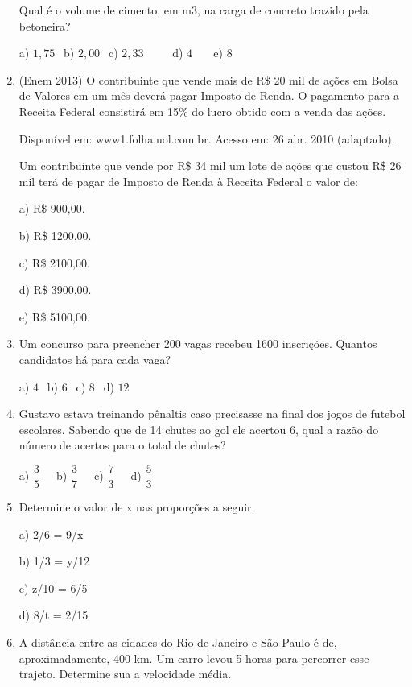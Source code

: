 \begin{multicols*}{2}
\begin{enumerate}
		      Qual é o volume de cimento, em m3, na carga de concreto trazido pela betoneira?

		      a) $1,75 \ \ $ b) $2,00 \ \ $ c) $2,33 \ \ \ \ \ \ \ \ \ \ $ d) $4 \ \ \ \ \ \ \ $ e) $8 \ \ $

		\item (Enem 2013) O contribuinte que vende mais de R\$ 20 mil de ações em Bolsa de Valores em um mês deverá pagar Imposto de Renda. O pagamento para a Receita Federal consistirá em 15\% do lucro obtido com a venda das ações.

		      Disponível em: www1.folha.uol.com.br. Acesso em: 26
		      abr. 2010 (adaptado).

		      Um contribuinte que vende por R\$ 34 mil um lote de ações que custou R\$ 26 mil terá de pagar de Imposto de Renda à
		      Receita Federal o valor de:

		      a) R\$ 900,00.

		      b) R\$ 1200,00.

		      c) R\$ 2100,00.

		      d) R\$ 3900,00.

		      e) R\$ 5100,00.\\

		\item Um concurso para preencher 200 vagas recebeu 1600 inscrições. Quantos candidatos há para cada vaga?

		      a) $4 \ \ $ b) $6 \ \ $ c) $8 \ \ $ d) $12 \ \ $

		\item Gustavo estava treinando pênaltis caso precisasse na final dos jogos de futebol escolares. Sabendo que de 14 chutes ao gol ele acertou 6, qual a razão do número de acertos para o total de chutes?

		      a) $\dfrac{3}{5} \ \ \ \ \ $ b) $\dfrac{3}{7} \ \ \ \ \ $ c) $\dfrac{7}{3} \ \ \ \ \ $ d) $\dfrac{5}{3} $

		\item Determine o valor de x nas proporções a seguir.

		      a) 2/6 = 9/x

		      b) 1/3 = y/12

		      c) z/10 = 6/5

		      d) 8/t = 2/15\\

		\item A distância entre as cidades do Rio de Janeiro e São Paulo é de, aproximadamente, 400 km. Um carro levou 5 horas para percorrer esse trajeto. Determine sua a velocidade média.\\


\end{enumerate}
\end{multicols*}

